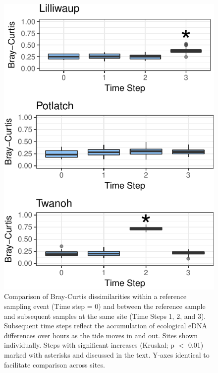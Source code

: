 \documentclass[fleqn,10pt,lineno]{wlpeerj} %
\begin{document}
\begin{figure}[!ht]

{\centering \includegraphics{figures/FIG3_BrayCurtis_timeSeries-1} 

}

\caption{\label{fig:TimeSeriesFigure}Comparison of Bray-Curtis dissimilarities within a reference sampling event (Time step = 0) and between the reference sample and subsequent samples at the same site (Time Steps 1, 2, and 3). Subsequent time steps reflect the accumulation of ecological eDNA differences over hours as the tide moves in and out. Sites shown individually. Steps with significant increases (Kruskal; p $<$ 0.01) marked with asterisks and discussed in the text. Y-axes identical to facilitate comparison across sites.}\label{fig:FIG3_BrayCurtis_timeSeries}
\end{figure}
\end{document}
